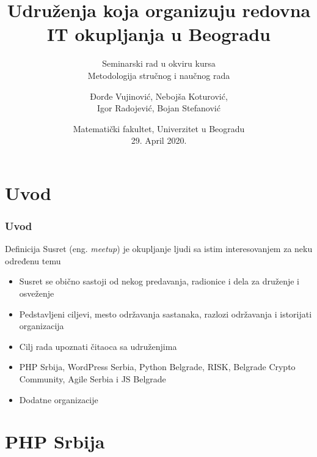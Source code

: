 \documentclass[hyperref={bookmarks=false},aspectratio=169]{beamer}
\title[]
{\bfseries{Udruženja koja organizuju redovna IT okupljanja u Beogradu}}
\subtitle{Seminarski rad u okviru kursa\\Metodologija stručnog i naučnog rada}
\author[]
{Đorđe Vujinović, Nebojša Koturović, \\Igor Radojević, Bojan Stefanović}
\date[ICUP, 2014]
{Matematički fakultet, Univerzitet u Beogradu\\29. April 2020.}
\begin{document}
\frame{\titlepage}  %


\section{Uvod}

\begin{frame}
\frametitle{Uvod}
\begin{block}{Definicija}
Susret (eng. \textit{meetup}) je okupljanje ljudi sa istim interesovanjem za neku određenu temu
\end{block}

\begin{itemize}
    \item Susret se obično sastoji od nekog predavanja, radionice i dela za druženje i osveženje
    \item Pedstavljeni ciljevi, mesto održavanja sastanaka, razlozi održavanja i istorijati organizacija
    \item Cilj rada upoznati čitaoca sa udruženjima
    \item PHP Srbija, WordPress Serbia, Python Belgrade, RISK, Belgrade Crypto Community, Agile Serbia i JS Belgrade
    \item Dodatne organizacije
\end{itemize}

\end{frame}

\section{PHP Srbija}
\end{document}
